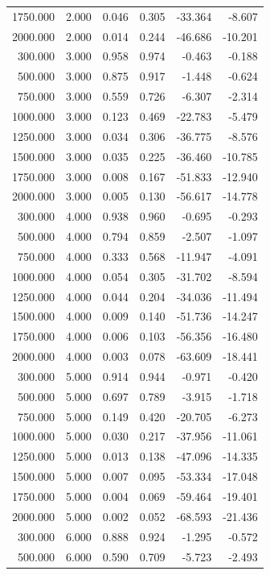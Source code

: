 {\begin{longtable}{rrrrrr}
1750.000 & 2.000 & 0.046 & 0.305 & -33.364 & -8.607 \\
2000.000 & 2.000 & 0.014 & 0.244 & -46.686 & -10.201 \\
300.000 & 3.000 & 0.958 & 0.974 & -0.463 & -0.188 \\
500.000 & 3.000 & 0.875 & 0.917 & -1.448 & -0.624 \\
750.000 & 3.000 & 0.559 & 0.726 & -6.307 & -2.314 \\
1000.000 & 3.000 & 0.123 & 0.469 & -22.783 & -5.479 \\
1250.000 & 3.000 & 0.034 & 0.306 & -36.775 & -8.576 \\
1500.000 & 3.000 & 0.035 & 0.225 & -36.460 & -10.785 \\
1750.000 & 3.000 & 0.008 & 0.167 & -51.833 & -12.940 \\
2000.000 & 3.000 & 0.005 & 0.130 & -56.617 & -14.778 \\
300.000 & 4.000 & 0.938 & 0.960 & -0.695 & -0.293 \\
500.000 & 4.000 & 0.794 & 0.859 & -2.507 & -1.097 \\
750.000 & 4.000 & 0.333 & 0.568 & -11.947 & -4.091 \\
1000.000 & 4.000 & 0.054 & 0.305 & -31.702 & -8.594 \\
1250.000 & 4.000 & 0.044 & 0.204 & -34.036 & -11.494 \\
1500.000 & 4.000 & 0.009 & 0.140 & -51.736 & -14.247 \\
1750.000 & 4.000 & 0.006 & 0.103 & -56.356 & -16.480 \\
2000.000 & 4.000 & 0.003 & 0.078 & -63.609 & -18.441 \\
300.000 & 5.000 & 0.914 & 0.944 & -0.971 & -0.420 \\
500.000 & 5.000 & 0.697 & 0.789 & -3.915 & -1.718 \\
750.000 & 5.000 & 0.149 & 0.420 & -20.705 & -6.273 \\
1000.000 & 5.000 & 0.030 & 0.217 & -37.956 & -11.061 \\
1250.000 & 5.000 & 0.013 & 0.138 & -47.096 & -14.335 \\
1500.000 & 5.000 & 0.007 & 0.095 & -53.334 & -17.048 \\
1750.000 & 5.000 & 0.004 & 0.069 & -59.464 & -19.401 \\
2000.000 & 5.000 & 0.002 & 0.052 & -68.593 & -21.436 \\
300.000 & 6.000 & 0.888 & 0.924 & -1.295 & -0.572 \\
500.000 & 6.000 & 0.590 & 0.709 & -5.723 & -2.493 \\

\end{longtable}}
